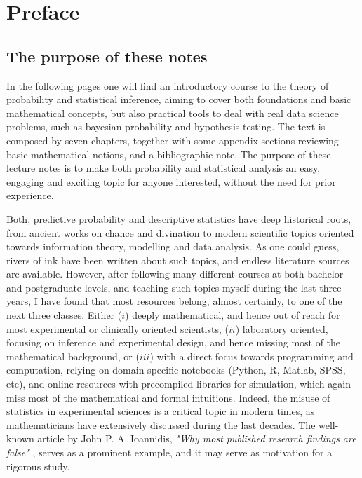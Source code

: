 \chapter*{Preface}

\section*{The purpose of these notes}

In the following pages one will find an introductory course to the theory of probability and statistical inference, aiming to cover both foundations and basic mathematical concepts, but also practical tools to deal with real data science problems, such as bayesian probability and hypothesis testing. The text is composed by seven chapters, together with some appendix sections reviewing basic mathematical notions, and a bibliographic note. The purpose of these lecture notes is to make both probability and statistical analysis an easy, engaging and exciting topic for anyone interested, without the need for prior experience.

\medskip

Both, predictive probability and descriptive statistics have deep historical roots, from ancient works on chance and divination to modern scientific topics oriented towards information theory, modelling and data analysis. As one could guess, rivers of ink have been written about such topics, and endless literature sources are available. However, after following many different courses at both bachelor and postgraduate levels, and teaching such topics myself during the last three years, I have found that most resources belong, almost certainly, to one of the next three classes. Either ($i$) deeply mathematical, and hence out of reach for most experimental or clinically oriented scientists, ($ii$) laboratory oriented, focusing on inference and experimental design, and hence missing most of the mathematical background, or ($iii$) with a direct focus towards programming and computation, relying on domain specific notebooks (\textsf{Python}, \textsf{R}, \textsf{Matlab}, \textsf{SPSS}, etc), and online resources with precompiled libraries for simulation, which again miss most of the mathematical and formal intuitions. Indeed, the misuse of statistics in experimental sciences is a critical topic in modern times, as mathematicians have extensively discussed during the last decades. The well-known article by John P. A. Ioannidis, \textit{"Why most published research findings are false"} \cite{ioannidis_2005_false}, serves as a prominent example, and it may serve as motivation for a rigorous study.

